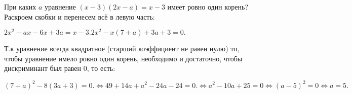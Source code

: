  При каких $a$ уравнение $(x-3)(2x-a)=x-3$ имеет ровно один корень?
\Solution Раскроем скобки и перенесем всё в левую часть: \begin{center}
$2x^2-ax-6x+3a=x-3.
2x^2-x(7+a)+3a+3=0.$\end{center}
Т.к уравнение всегда квадратное (старший коэффициент не равен нулю) то, чтобы уравнение имело ровно один корень, необходимо и достаточно, чтобы дискриминант был равен $0$, то есть:
\begin{center}
$(7+a)^2-8(3a+3)=0. \Leftrightarrow 49+14a+a^2-24a-24=0.\Leftrightarrow a^2-10a+25=0 \Leftrightarrow (a-5)^2=0 \Leftrightarrow a=5.$\\
\end{center}
